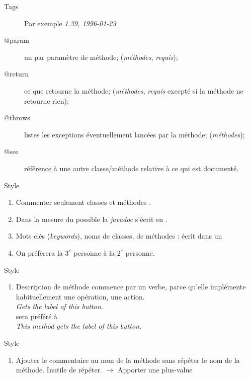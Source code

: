 \begin{hideedit}
\begin{frame}{Tags}
\begin{description}
      \par Par exemple \textit{1.39, 1996-01-23}
    \item[@param] un par paramètre de méthode;
      (\textit{méthodes}, \textit{requis});
    \item[@return] ce que retourne la méthode;
      (\textit{méthodes}, \textit{requis} excepté si la méthode ne retourne rien);
    \item[@throws] listes les exceptions éventuellement lancées par la méthode;
      (\textit{méthodes});
    \item[@see] référence à une autre classe/méthode relative
      à ce qui est documenté.
  \end{description}
\end{frame}

\begin{frame}[fragile]{Style}
  \begin{enumerate}[<+->]
    \item Commenter seulement classes et méthodes .
    \item Dans la mesure du possible la \textit{javadoc} s'écrit en
      .
    \item Mots clés (\textit{keywords}), noms de classes, de méthodes :
      écrit dans un  
    \item On préfèrera la $3^e$ personne à la $2^e$ personne.
    \seti
  \end{enumerate}
\end{frame}
\begin{frame}[fragile]{Style}
  \begin{enumerate}
    \conti
    \item Description de méthode commence par un verbe, parce qu'elle
      implémente habituellement une opération, une action.\\
      \medskip 
      \quad\textit{Gets the label of this button.} \\
      sera préféré à \\
      \quad\textit{This method gets the label of this button.}
    \seti
  \end{enumerate}
\end{frame}
\begin{frame}[fragile]{Style}
  \begin{enumerate}
    \conti
    \item Ajouter le commentaire au nom de la méthode sans répéter le nom de la
      méthode. Inutile de répéter. \(\rightarrow\) Apporter une plus-value

\end{enumerate}
\end{frame}
\end{hideedit}
